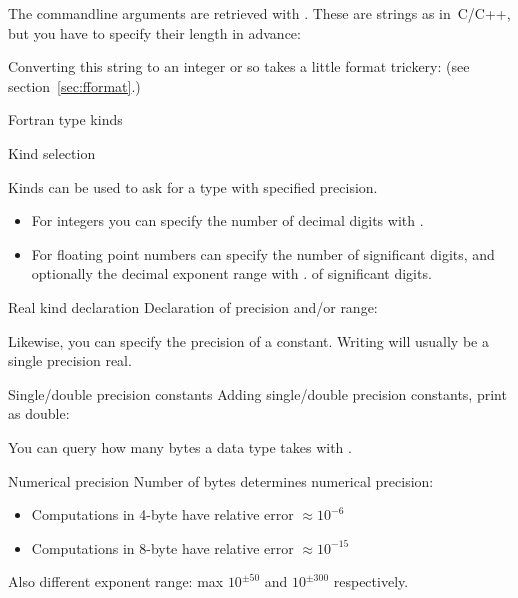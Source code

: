 The commandline arguments are retrieved with
.
These are strings as in~C/C++,
but you have to specify their length in advance:

Converting this string to an integer or so takes a little format trickery:
(see section~\ref{sec:fformat}.)

 {Fortran type kinds}

 {Kind selection}

Kinds can be used to ask for a type with specified precision.
\begin{itemize}
\item For integers you can specify the number of decimal digits with
  .
\item For floating point numbers can specify the number of
  significant digits, and optionally the decimal exponent range with
  .
  of significant digits.
\end{itemize}

\begin{block}{Real kind declaration}
  Declaration of precision and/or range:
\end{block}

Likewise, you can specify the precision of a constant.
Writing  will usually be a single precision
real. 

\begin{block}{Single/double precision constants}
  \label{sl:fsingledouble}
  Adding single/double precision constants, print as double:
\end{block}

You can query how many bytes a data type takes with
.

\begin{block}{Numerical precision}
  \label{sl:fprecision48}
  Number of bytes determines numerical precision:
  \begin{itemize}
  \item Computations in 4-byte have relative error $\approx 10^{-6}$
  \item Computations in 8-byte have relative error $\approx 10^{-15}$
  \end{itemize}
  Also different exponent range: max $10^{\pm 50}$ and $10^{\pm 300}$ respectively.
\end{block}

